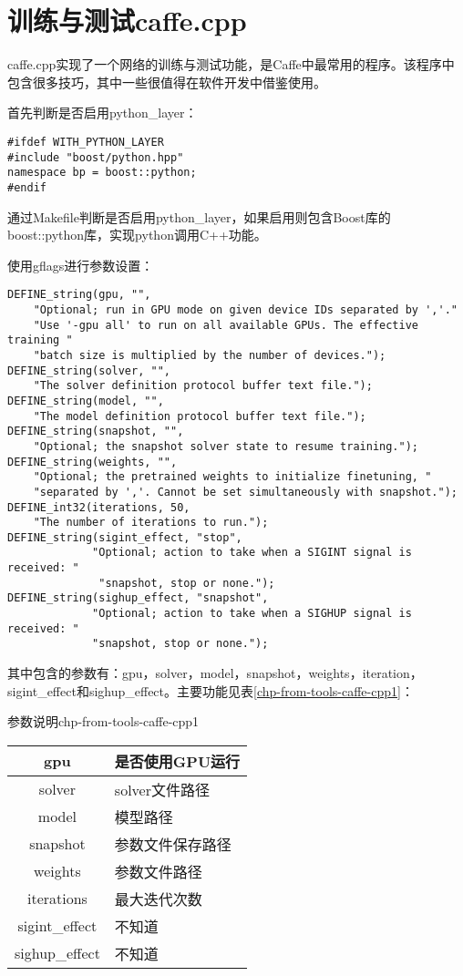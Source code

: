 \section{训练与测试caffe.cpp}
caffe.cpp实现了一个网络的训练与测试功能，是Caffe中最常用的程序。该程序中包含很多技巧，其中一些很值得在软件开发中借鉴使用。


首先判断是否启用python\_layer：
\begin{verbatim}
#ifdef WITH_PYTHON_LAYER
#include "boost/python.hpp"
namespace bp = boost::python;
#endif
\end{verbatim}
通过Makefile判断是否启用python\_layer，如果启用则包含Boost库的boost::python库，实现python调用C++功能。


使用gflags进行参数设置：
\begin{verbatim}
DEFINE_string(gpu, "",
    "Optional; run in GPU mode on given device IDs separated by ','."
    "Use '-gpu all' to run on all available GPUs. The effective training "
    "batch size is multiplied by the number of devices.");
DEFINE_string(solver, "",
    "The solver definition protocol buffer text file.");
DEFINE_string(model, "",
    "The model definition protocol buffer text file.");
DEFINE_string(snapshot, "",
    "Optional; the snapshot solver state to resume training.");
DEFINE_string(weights, "",
    "Optional; the pretrained weights to initialize finetuning, "
    "separated by ','. Cannot be set simultaneously with snapshot.");
DEFINE_int32(iterations, 50,
    "The number of iterations to run.");
DEFINE_string(sigint_effect, "stop",
             "Optional; action to take when a SIGINT signal is received: "
              "snapshot, stop or none.");
DEFINE_string(sighup_effect, "snapshot",
             "Optional; action to take when a SIGHUP signal is received: "
             "snapshot, stop or none.");
\end{verbatim}
其中包含的参数有：gpu，solver，model，snapshot，weights，iteration，sigint\_effect和sighup\_effect。主要功能见表\ref{chp-from-tools-caffe-cpp1}：
\begin{cntable}{参数说明}{chp-from-tools-caffe-cpp1}
  \begin{tabular}{|c|l|}
    \hline
    gpu & 是否使用GPU运行 \\ \hline
    solver & solver文件路径 \\ \hline
    model & 模型路径 \\ \hline
    snapshot & 参数文件保存路径 \\ \hline
    weights & 参数文件路径 \\ \hline
    iterations & 最大迭代次数 \\ \hline
    sigint\_effect & 不知道 \\ \hline
    sighup\_effect & 不知道 \\
    \hline
  \end{tabular}
\end{cntable}